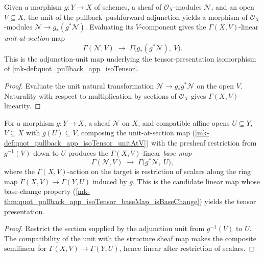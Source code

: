 \begin{definition}\label{mk-def:quot_pullback_app_isoTensor_unitAtV}
  \leanok

  Given a morphism \(g : Y \to X\) of schemes, a sheaf of
  \(\mathcal{O}_X\)-modules \(\mathcal{N}\), and an open \(V \subseteq X\),
  the unit of the pullback--pushforward adjunction yields a morphism of
  \(\mathcal{O}_X\)-modules \(\mathcal{N} \to g_*(g^* \mathcal{N})\).
  Evaluating its \(V\)-component gives the \(\Gamma(X, V)\)-linear
  \emph{unit-at-section} map
  \[
    \Gamma(\mathcal{N}, V)
    \;\longrightarrow\;
    \Gamma\bigl(g_*(g^* \mathcal{N}),\ V\bigr).
  \]
  This is the adjunction-unit map underlying the tensor-presentation
  isomorphism of \ref{mk-def:quot_pullback_app_isoTensor}.
\end{definition}
\begin{proof}
  Evaluate the unit natural transformation
  \(\mathcal N\to g_*g^*\mathcal N\) on the open \(V\). Naturality with
  respect to multiplication by sections of \(\mathcal O_X\) gives
  \(\Gamma(X,V)\)-linearity.
\end{proof}

\begin{definition}\label{mk-def:quot_pullback_app_isoTensor_baseMap}
  \leanok

  For a morphism \(g : Y \to X\), a sheaf \(\mathcal{N}\) on \(X\), and
  compatible affine opens \(U \subseteq Y\), \(V \subseteq X\) with
  \(g(U) \subseteq V\), composing the unit-at-section map
  (\ref{mk-def:quot_pullback_app_isoTensor_unitAtV}) with the presheaf
  restriction from \(g^{-1}(V)\) down to \(U\) produces the
  \(\Gamma(X, V)\)-linear \emph{base map}
  \[
    \Gamma(\mathcal{N}, V)
    \;\longrightarrow\;
    \Gamma\bigl(g^* \mathcal{N},\ U\bigr),
  \]
  where the \(\Gamma(X, V)\)-action on the target is restriction of scalars
  along the ring map \(\Gamma(X, V) \to \Gamma(Y, U)\) induced by \(g\). This
  is the candidate linear map whose base-change property
  (\ref{mk-thm:quot_pullback_app_isoTensor_baseMap_isBaseChange}) yields the
  tensor presentation.
\end{definition}
\begin{proof}
  Restrict the section supplied by the adjunction unit from
  \(g^{-1}(V)\) to \(U\). The compatibility of the unit with the structure
  sheaf map makes the composite semilinear for
  \(\Gamma(X,V)\to\Gamma(Y,U)\), hence linear after restriction of scalars.
\end{proof}

